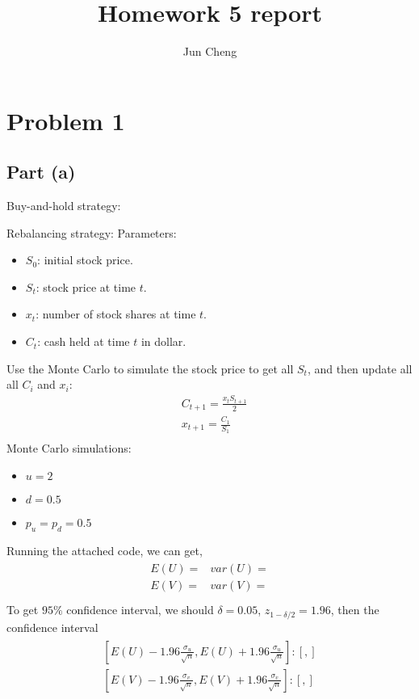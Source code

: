 \documentclass{report}
\begin{document}
\title{Homework 5 report}
\author{Jun Cheng}
\maketitle

\section*{Problem 1} 
\subsection*{Part (a)} 
Buy-and-hold strategy: 

Rebalancing strategy: 
Parameters: 
\begin{itemize}
\item $S_0$: initial stock price.
\item $S_t$: stock price at time $t$.
\item $x_t$: number of stock shares at time $t$.
\item $C_t$: cash held at time $t$ in dollar. 
\end{itemize}
Use the Monte Carlo to simulate the stock price to get all $S_t$,  and then update all all $C_i $ and $x_i$: 
\begin{align*}
&C_{t+1}=\frac{x_tS_{t+1}}{2} \\
&x_{t+1}=\frac{C_1}{S_1}\\
\end{align*}
Monte Carlo simulations: 
\begin{itemize}
\item $ u=2$
\item $ d=0.5$
\item $p_u = p_d = 0.5$
\end{itemize} 
Running the attached code, we can get, 
\begin{align*}\begin{array}{ll}
E(U)=  & var(U) =\\
E(V)=   & var(V)=\\
\end{array} \end{align*}
To get $95\% $ confidence interval, we should $\delta = 0.05$, $z_{1-\delta/2}=1.96$, then the confidence interval
\begin{align*}
\begin{array}{ll}
\left[E(U)-1.96\frac{\sigma_u}{\sqrt{n}}, E(U)+1.96\frac{\sigma_u}{\sqrt{n}}\right]  :   [   ,  ]\\
\left[E(V)-1.96\frac{\sigma_v}{\sqrt{n}},  E(V)+1.96\frac{\sigma_v}{\sqrt{n}}\right]  :   [   ,  ]\\
\end{array}
\end{align*}
\end{document}
